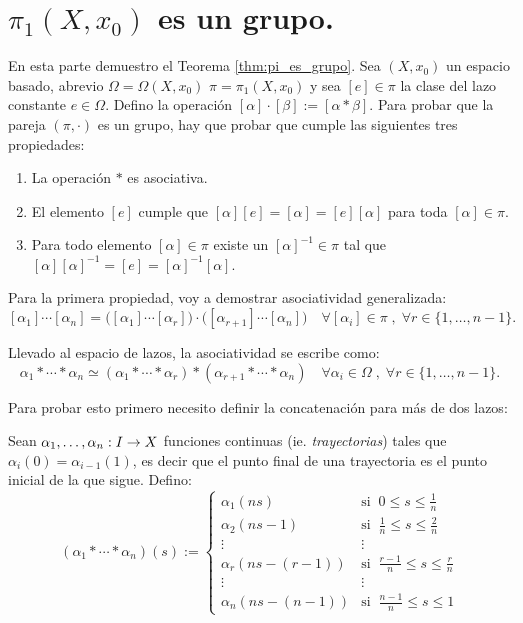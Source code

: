 \documentclass[../../topologia_algebraica]{subfiles}
\begin{document}
\section{$\pi_1(X,x_0)$ es un grupo.}
En esta parte demuestro el Teorema \ref{thm:pi_es_grupo}. Sea $(X,x_0)$ un espacio basado,
abrevio $\Omega=\Omega(X,x_0)$ $\pi=\pi_1(X,x_0)$ y sea $[e]\in\pi$ la clase del lazo constante
$e\in\Omega$. Defino la operaci\'on $[\alpha]\cdot[\beta]:=[\alpha *\beta]$. Para probar
que la pareja $(\pi,\cdot)$ es un grupo, hay que probar que cumple las siguientes tres propiedades:
\begin{enumerate}
\item La operaci\'on $*$ es asociativa.
\item El elemento $[e]$ cumple que $[\alpha][e]=[\alpha]=[e][\alpha]$ para toda $[\alpha]\in\pi$.
\item Para todo elemento $[\alpha]\in\pi$ existe un $[\alpha]^{-1}\in\pi$ tal que
  $[\alpha][\alpha]^{-1}=[e]=[\alpha]^{-1}[\alpha]$.
\end{enumerate}

Para la primera propiedad, voy a demostrar asociatividad generalizada:
\begin{equation}
  \label{eq:asociatividad}
  [\alpha_1]\cdots[\alpha_n] =
  \Big([\alpha_1]\cdots[\alpha_r]\Big)\cdot\Big([\alpha_{r+1}]\cdots[\alpha_n]\Big)
  \quad \forall [\alpha_i]\in\pi\; , \; \forall r\in\{1,\ldots,n-1\}.
\end{equation}

Llevado al espacio de lazos, la asociatividad se escribe como:
\begin{equation}
  \label{eq:asociatividadc}
  \alpha_1*\cdots*\alpha_n \simeq (\alpha_1*\cdots*\alpha_r)*(\alpha_{r+1}*\cdots*\alpha_n)
  \quad \forall \alpha_i\in\Omega\; , \; \forall r\in\{1,\ldots,n-1\}.
\end{equation}
  
Para probar esto primero necesito definir la concatenaci\'on para m\'as de dos lazos:

\begin{defin}
  Sean $\alpha_1,\ldots,\alpha_n:I\rightarrow X$ funciones continuas (ie. \emph{trayectorias}) tales
  que $\alpha_i(0)=\alpha_{i-1}(1)$, es decir que el punto final de una trayectoria es el punto
  inicial de la que sigue. Defino:
  \[%
    (\alpha_1*\cdots *\alpha_n)(s):=%
    \begin{cases}%
      \alpha_1(ns) & \text{si}\;\; 0\leq s\leq\frac{1}{n} \\
      \alpha_2(ns-1) & \text{si}\;\;\frac{1}{n}\leq s\leq \frac{2}{n} \\
      \vdots & \vdots \\
      \alpha_r(ns-(r-1)) & \text{si}\;\;\frac{r-1}{n}\leq s \leq \frac{r}{n} \\
      \vdots & \vdots \\
      \alpha_n(ns-(n-1)) & \text{si}\;\;\frac{n-1}{n} \leq s \leq 1
    \end{cases}%
  \]%
\end{defin}
\end{document}

